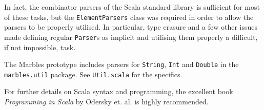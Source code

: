 In fact, the combinator parsers of the Scala standard library is sufficient
for most of these tasks, but the \texttt{ElementParsers} class was required
in order to allow the parsers to be properly utilised. In particular, type
erasure and a few other issues made defining regular \texttt{Parser}s as
implicit and utilising them properly a difficult, if not impossible, task.  

The Marbles prototype includes parsers for \texttt{String}, \texttt{Int} and
\texttt{Double} in the \texttt{marbles.util} package. See
\texttt{Util.scala} for the specifics.

For further details on Scala syntax and programming, the excellent book
\textit{Programming in Scala} by Odersky et. al. is highly recommended. 

